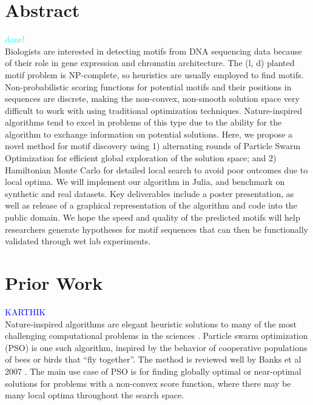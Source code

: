 \documentclass{article}
\begin{document}
\section{Abstract}
\textcolor{cyan}{done!} \\
Biologists are interested in detecting motifs from DNA sequencing data because of their role in gene expression and chromatin architecture.
The (l, d) planted motif problem is NP-complete, so heuristics are usually employed to find motifs. Non-probabilistic scoring functions for potential motifs and their positions in sequences are discrete, making the non-convex, non-smooth solution space very difficult to work with using traditional optimization techniques. Nature-inspired algorithms tend to excel in problems of this type due to the ability for the algorithm to exchange information on potential solutions. Here, we propose a novel method for motif discovery using 1) alternating rounds of Particle Swarm Optimization for efficient global exploration of the solution space; and 2) Hamiltonian Monte Carlo for detailed local search to avoid poor outcomes due to local optima. We will implement our algorithm in Julia, and benchmark on synthetic and real datasets. Key deliverables include a poster presentation, as well as release of a graphical representation of the algorithm and code into the public domain. We hope the speed and quality of the predicted motifs will help researchers generate hypotheses for motif sequences that can then be functionally validated through wet lab experiments.
\section{Prior Work}
\textcolor{blue}{KARTHIK} \\
Nature-inspired algorithms are elegant heuristic solutions to many of the most challenging computational problems in the sciences \cite{fister2013brief}. Particle swarm optimization (PSO) is one such algorithm, inspired by the behavior of cooperative populations of bees or birds that ``fly together''. The method is reviewed well by Banks et al 2007 \cite{banks2007review}. The main use case of PSO is for finding globally optimal or near-optimal solutions for problems with a non-convex score function, where there may be many local optima throughout the search space. 
  
\end{document}

